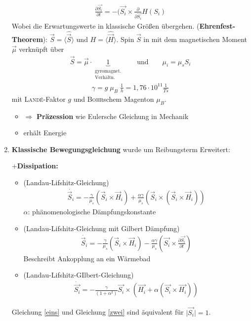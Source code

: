 \documentclass[12pt]{article}
\begin{document}
\begin{enumerate}
  \begin{align*}
 \frac{\partial \vec{S_i}}{\partial t}= - ( \vec{S_i} \times \frac{\partial}{\partial \vec{S_i}} H(S_i)
  \end{align*}
  Wobei die Erwartungswerte in klassische Größen übergehen. (\textbf{Ehrenfest-Theorem}): $\vec{S} = \langle \hat{\vec{S}} \rangle$ und $H= \langle \hat{\vec{H}} \rangle$. Spin $\vec{S}$ in mit dem magnetischen Moment $\vec{\mu}$ verknüpft über 
  \begin{align*}
  \vec{S}= \vec{\mu} \cdot \underbrace{1}_{\substack{ \text{gyromagnet.} \\ \text{Verhältn.}}} \qquad  \text{und}\qquad \mu_i = \mu_s S_i
  \end{align*}
  \begin{align*}
  \gamma = g \; \mu_B \; \frac{1}{h} = 1,76 \cdot 10^{11} \frac{1}{Ts}
  \end{align*}
  mit \textsc{Landé}-Faktor $g$ und \textsc{Bohr}schem Magenton $\mu_B$.
  \begin{itemize}
  \item $\Rightarrow$ \textbf{Präzession} wie Eulersche Gleichung in Mechanik
  \item erhält Energie
  \end{itemize}
  \item \textbf{Klassische Bewegungsgleichung} wurde um Reibungsterm Erweitert:
  
  \textbf{$+$Dissipation:}
  \begin{itemize}
 \item (Landau-Lifshitz-Gleichung)
  \begin{align}
  \dot{\vec{S}_i}= -\frac{\gamma}{\mu_s} (\vec{S}_i \times \vec{H}_i ) + \frac{\alpha \gamma}{\mu_s} (\vec{S}_i \times ( \vec{S}_i \times \vec{H}_i))
  \end{align}
  $\alpha$: phänomenologische Dämpfungskonstante \\
  
  \item (Landau-Lifshitz-Gleichung mit Gilbert Dämpfung) \label{eins}
  \begin{align*}
   \dot{\vec{S}_i}= -\frac{\gamma}{\mu_s} (\vec{S}_i \times \vec{H}_i ) - \frac{\alpha \gamma}{\mu_s} ( \vec{S_i} \times \frac{\partial \vec{S_i}}{\partial t} )
   \end{align*}
   Beschreibt Ankopplung an ein Wärmebad
   \item (Landau-Lifshitz-GIlbert-Gleichung) \label{zwei}
   \begin{align*}
  \dot{ \vec{S_i}} = - \frac{\gamma}{(1+\alpha^2)} \vec{S_i} \times \left( \vec{H_i} + \alpha (\vec{S_i} \times \vec{H_i})\right)
   \end{align*}
\end{itemize}
Gleichung \ref{eins} und Gleichung \ref{zwei} sind äquivalent für $\vert \vec{S_i} \vert = 1 $.
   

\end{enumerate}
\end{document}
